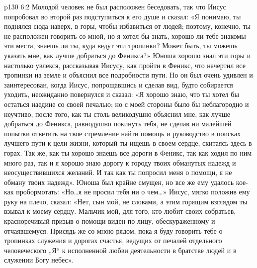 \vs p130 6:2 Молодой человек не был расположен беседовать, так что Иисус попробовал во второй раз подступиться к его душе и сказал: «Я понимаю, ты поднялся сюда наверх, в горы, чтобы избавиться от людей; поэтому, конечно, ты не расположен говорить со мной, но я хотел бы знать, хорошо ли тебе знакомы эти места, знаешь ли ты, куда ведут эти тропинки? Может быть, ты можешь указать мне, как лучше добраться до Феникса?» Юноша хорошо знал эти горы и настолько увлекся, рассказывая Иисусу, как пройти в Феникс, что начертил все тропинки на земле и объяснил все подробности пути. Но он был очень удивлен и заинтересован, когда Иисус, попрощавшись и сделав вид, будто собирается уходить, неожиданно повернулся и сказал: «Я хорошо знаю, что ты хотел бы остаться наедине со своей печалью; но с моей стороны было бы неблагородно и неучтиво, после того, как ты столь великодушно объяснил мне, как лучше добраться до Феникса, равнодушно покинуть тебя, не сделав ни малейшей попытки ответить на твое стремление найти помощь и руководство в поисках лучшего пути к цели жизни, который ты ищешь в своем сердце, скитаясь здесь в горах. Так же, как ты хорошо знаешь все дороги в Феникс, так как ходил по ним много раз, так и я хорошо знаю дорогу к городу твоих обманутых надежд и неосуществившихся желаний. И так как ты попросил меня о помощи, я не обману твоих надежд». Юноша был крайне смущен, но все же ему удалось кое\hyp{}как пробормотать: «Но\ldots я не просил тебя ни о чем\ldots » Иисус, мягко положив ему руку на плечо, сказал: «Нет, сын мой, не словами, а этим горящим взглядом ты взывал к моему сердцу. Мальчик мой, для того, кто любит своих собратьев, красноречивый призыв о помощи виден по лицу, обескураженному и отчаявшемуся. Присядь же со мною рядом, пока я буду говорить тебе о тропинках служения и дорогах счастья, ведущих от печалей отдельного человеческого „Я“ к исполненной любви деятельности в братстве людей и в служении Богу небес».
